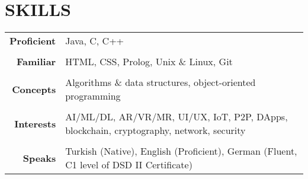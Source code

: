 \documentclass[a4paper, 10pt]{article}
\begin{document}
\section{SKILLS}
{\renewcommand{\arraystretch}{0.7}
\begin{tabular}{r p{15.4cm}}
    \textbf{Proficient} & Java, C, C++\\\\
    \textbf{Familiar} & HTML, CSS, Prolog, Unix \& Linux, Git\\\\
    \textbf{Concepts} & Algorithms \& data structures, object-oriented programming\\\\
    \textbf{Interests} & AI/ML/DL, AR/VR/MR, UI/UX, IoT, P2P, DApps, blockchain, cryptography, network, security\\\\
    \textbf{Speaks} & Turkish (Native), English (Proficient), German (Fluent, C1 level of DSD II Certificate)
\end{tabular}}
\end{document}
